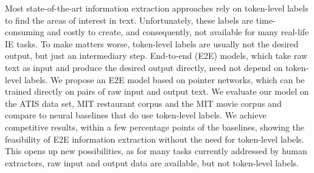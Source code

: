 Most state-of-the-art information extraction approaches rely on token-level labels to find the areas of interest in text. Unfortunately, these labels are time-consuming and costly to create, and consequently, not available for many real-life IE tasks. To make matters worse, token-level labels are usually not the desired output, but just an intermediary step. End-to-end (E2E) models, which take raw text as input and produce the desired output directly, need not depend on token-level labels. We propose an E2E model based on pointer networks, which can be trained directly on pairs of raw input and output text. We evaluate our model on the ATIS data set, MIT restaurant corpus and the MIT movie corpus and compare to neural baselines that do use token-level labels. We achieve competitive results, within a few percentage points of the baselines, showing the feasibility of E2E information extraction without the need for token-level labels. This opens up new possibilities, as for many tasks currently addressed by human extractors, raw input and output data are available, but not token-level labels.
